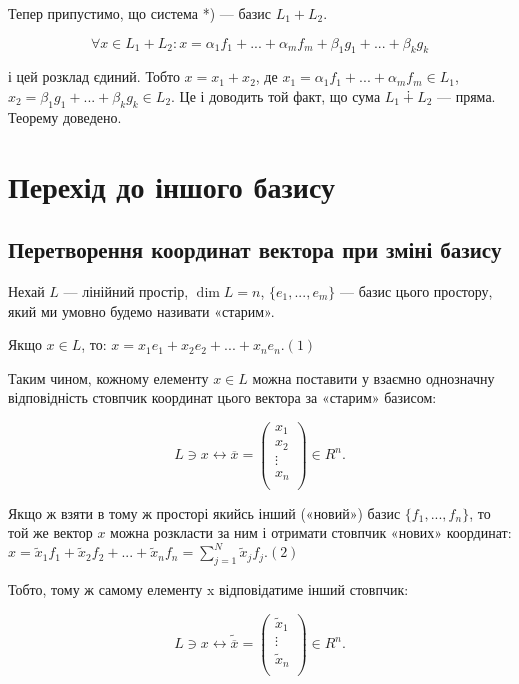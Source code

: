 Тепер припустимо, що система *) --- базис $L_1 + L_2$.

$$\forall x \in L_1 + L_2: x = \alpha_1 f_1 + ... + \alpha_m f_m + \beta_1 g_1 + ... + \beta_k g_k$$

і цей розклад єдиний. Тобто $x = x_1 + x_2$, де $x_1 = \alpha_1 f_1 + ... + \alpha_m f_m \in L_1$,
$x_2 = \beta_1 g_1 + ... + \beta_k g_k \in L_2$. Це і доводить той факт, що сума $L_1 \dotplus L_2$ --- пряма.
Теорему доведено. 

\section{Перехід до іншого базису}

\subsection*{Перетворення координат вектора при зміні базису}

Нехай $L$ --- лінійний простір, $\dim L = n$, $\{e_1, ..., e_m\}$ --- базис цього простору,
який ми умовно будемо називати «старим».

Якщо $x \in L$, то: $x = x_1 e_1 + x_2 e_2 + ... + x_n e_n. (1)$

Таким чином, кожному елементу $x \in L$ можна поставити у взаємно
однозначну відповідність стовпчик координат цього вектора за «старим»
базисом:

$$L \ni x \leftrightarrow \overline{x} = \begin{pmatrix}
	x_1 \\
	x_2 \\
	\vdots \\
	x_n \\
\end{pmatrix} \in R^n.$$

Якщо ж взяти в тому ж просторі якийсь інший («новий») базис
$\{f_1, ..., f_n\}$, то той же вектор $x$ можна розкласти за ним і отримати стовпчик
«нових» координат: $x = \tilde{x}_1 f_1 + \tilde{x}_2 f_2 + ... + \tilde{x}_n f_n = \sum\limits_{j=1}^N \tilde{x}_j f_j. (2)$

Тобто, тому ж самому елементу x відповідатиме інший стовпчик:

$$L \ni x \leftrightarrow \tilde{\overline{x}} = \begin{pmatrix}
	\tilde{x}_1 \\
	\vdots \\
	\tilde{x}_n \\
\end{pmatrix} \in R^n.$$



